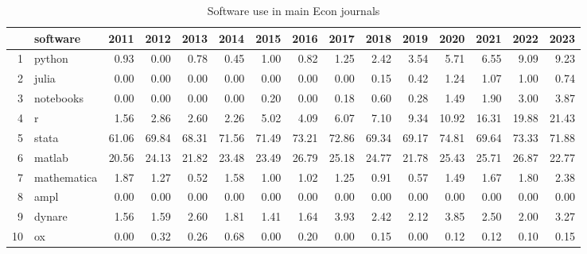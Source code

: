 \begin{table}[ht]
\centering
\caption{Software use in main Econ journals} 
\label{tab:software:byyear}
\begin{tabular}{rlrrrrrrrrrrrrr}
  \hline
 & software & 2011 & 2012 & 2013 & 2014 & 2015 & 2016 & 2017 & 2018 & 2019 & 2020 & 2021 & 2022 & 2023 \\ 
  \hline
1 & python & 0.93 & 0.00 & 0.78 & 0.45 & 1.00 & 0.82 & 1.25 & 2.42 & 3.54 & 5.71 & 6.55 & 9.09 & 9.23 \\ 
  2 & julia & 0.00 & 0.00 & 0.00 & 0.00 & 0.00 & 0.00 & 0.00 & 0.15 & 0.42 & 1.24 & 1.07 & 1.00 & 0.74 \\ 
  3 & notebooks & 0.00 & 0.00 & 0.00 & 0.00 & 0.20 & 0.00 & 0.18 & 0.60 & 0.28 & 1.49 & 1.90 & 3.00 & 3.87 \\ 
  4 & r & 1.56 & 2.86 & 2.60 & 2.26 & 5.02 & 4.09 & 6.07 & 7.10 & 9.34 & 10.92 & 16.31 & 19.88 & 21.43 \\ 
  5 & stata & 61.06 & 69.84 & 68.31 & 71.56 & 71.49 & 73.21 & 72.86 & 69.34 & 69.17 & 74.81 & 69.64 & 73.33 & 71.88 \\ 
  6 & matlab & 20.56 & 24.13 & 21.82 & 23.48 & 23.49 & 26.79 & 25.18 & 24.77 & 21.78 & 25.43 & 25.71 & 26.87 & 22.77 \\ 
  7 & mathematica & 1.87 & 1.27 & 0.52 & 1.58 & 1.00 & 1.02 & 1.25 & 0.91 & 0.57 & 1.49 & 1.67 & 1.80 & 2.38 \\ 
  8 & ampl & 0.00 & 0.00 & 0.00 & 0.00 & 0.00 & 0.00 & 0.00 & 0.00 & 0.00 & 0.00 & 0.00 & 0.00 & 0.00 \\ 
  9 & dynare & 1.56 & 1.59 & 2.60 & 1.81 & 1.41 & 1.64 & 3.93 & 2.42 & 2.12 & 3.85 & 2.50 & 2.00 & 3.27 \\ 
  10 & ox & 0.00 & 0.32 & 0.26 & 0.68 & 0.00 & 0.20 & 0.00 & 0.15 & 0.00 & 0.12 & 0.12 & 0.10 & 0.15 \\ 
   \hline
\end{tabular}
\end{table}
